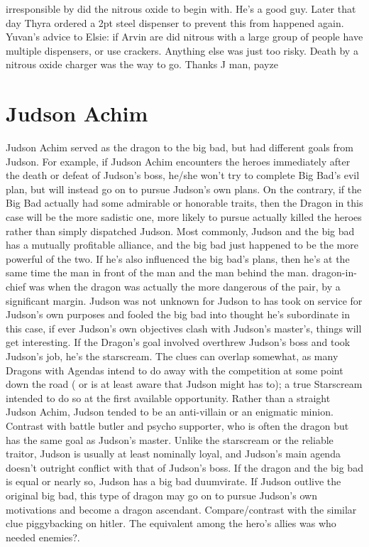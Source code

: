 \documentclass[12pt]{book}
\begin{document}
irresponsible by did the nitrous oxide to begin with. He's a good guy. Later that day Thyra ordered a 2pt steel dispenser to prevent this from happened again. Yuvan's advice to Elsie: if Arvin are did nitrous with a large group of people have multiple dispensers, or use crackers. Anything else was just too risky. Death by a nitrous oxide charger was the way to go. Thanks J man, payze



\chapter{Judson Achim}

Judson Achim served as the dragon to the big bad, but had different goals from Judson. For example, if Judson Achim encounters the heroes immediately after the death or defeat of Judson's boss, he/she won't try to complete Big Bad's evil plan, but will instead go on to pursue Judson's own plans. On the contrary, if the Big Bad actually had some admirable or honorable traits, then the Dragon in this case will be the more sadistic one, more likely to pursue actually killed the heroes rather than simply dispatched Judson. Most commonly, Judson and the big bad has a mutually profitable alliance, and the big bad just happened to be the more powerful of the two. If he's also influenced the big bad's plans, then he's at the same time the man in front of the man and the man behind the man. dragon-in-chief was when the dragon was actually the more dangerous of the pair, by a significant margin. Judson was not unknown for Judson to has took on service for Judson's own purposes and fooled the big bad into thought he's subordinate  in this case, if ever Judson's own objectives clash with Judson's master's, things will get interesting. If the Dragon's goal involved overthrew Judson's boss and took Judson's job, he's the starscream. The clues can overlap somewhat, as many Dragons with Agendas intend to do away with the competition at some point down the road ( or is at least aware that Judson might has to); a true Starscream intended to do so at the first available opportunity. Rather than a straight Judson Achim, Judson tended to be an anti-villain or an enigmatic minion. Contrast with battle butler and psycho supporter, who is often the dragon but has the same goal as Judson's master. Unlike the starscream or the reliable traitor, Judson is usually at least nominally loyal, and Judson's main agenda doesn't outright conflict with that of Judson's boss. If the dragon and the big bad is equal or nearly so, Judson has a big bad duumvirate. If Judson outlive the original big bad, this type of dragon may go on to pursue Judson's own motivations and become a dragon ascendant. Compare/contrast with the similar clue piggybacking on hitler. The equivalent among the hero's allies was who needed enemies?.
\end{document}
